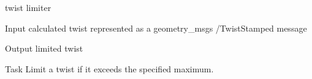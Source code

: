 \begin{frame}{twist limiter}
	\begin{alertblock}{Input}
	calculated twist represented as a geometry\_msgs /TwistStamped message
    \end{alertblock}
    
    \begin{alertblock}{Output}
	limited twist
    \end{alertblock}
    
    \begin{alertblock}{Task}
    Limit a twist if it exceeds the specified maximum.
    \end{alertblock}
\end{frame}

